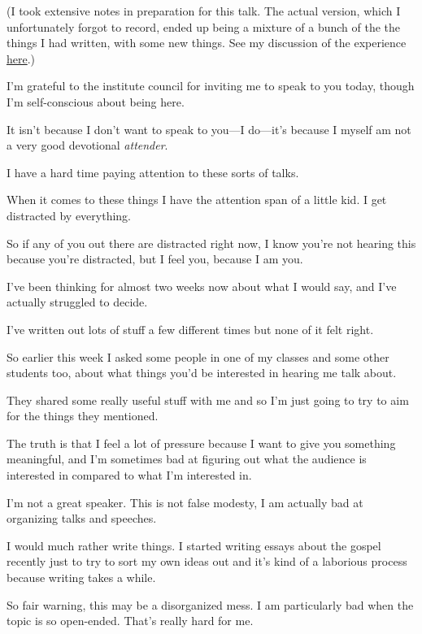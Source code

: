 		(I took extensive notes in preparation for this talk. The actual version, which I unfortunately forgot to record, ended up being a mixture of a bunch of the the things I had written, with some new things. See my discussion of the experience \hyperref[SE-WHY]{here}.)
		
		\begin{compactitem}
		
			\item I'm grateful to the institute council for inviting me to speak to you today, though I'm self-conscious about being here.
				\begin{compactitem}
					\item It isn't because I don't want to speak to you---I do---it's because I myself am not a very good devotional \textit{attender}.
					\item I have a hard time paying attention to these sorts of talks.
					\item When it comes to these things I have the attention span of a little kid. I get distracted by everything.
					\item So if any of you out there are distracted right now, I know you're not hearing this because you're distracted, but I feel you, because I am you.
				\end{compactitem}
			
			\item I've been thinking for almost two weeks now about what I would say, and I've actually struggled to decide.
				\begin{compactitem}
					\item I've written out lots of stuff a few different times but none of it felt right.
					\item So earlier this week I asked some people in one of my classes and some other students too, about what things you'd be interested in hearing me talk about.
					\item They shared some really useful stuff with me and so I'm just going to try to aim for the things they mentioned.
					\item The truth is that I feel a lot of pressure because I want to give you something meaningful, and I'm sometimes bad at figuring out what the audience is interested in compared to what I'm interested in.
					\item I'm not a great speaker. This is not false modesty, I am actually bad at organizing talks and speeches.
					\item I would much rather write things. I started writing essays about the gospel recently just to try to sort my own ideas out and it's kind of a laborious process because writing takes a while.
					\item So fair warning, this may be a disorganized mess. I am particularly bad when the topic is so open-ended. That's really hard for me.
				\end{compactitem}
				

\end{compactitem}
